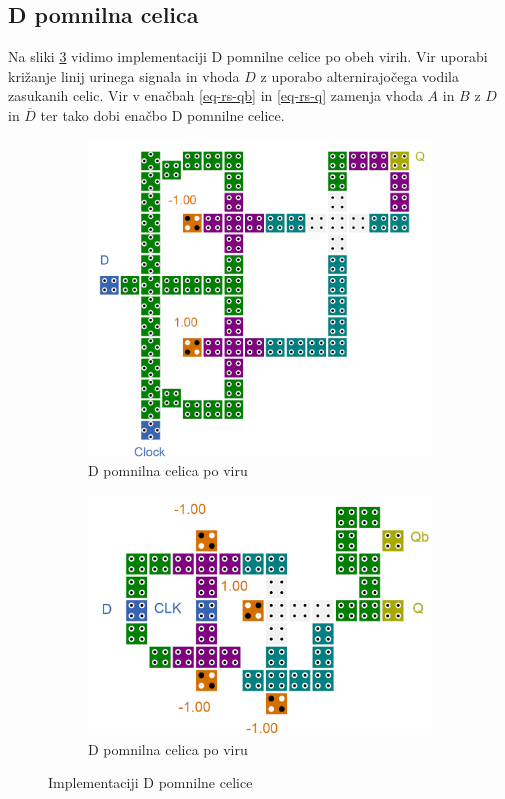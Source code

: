 \documentclass[a4paper, 11pt]{article}
\begin{document}
\subsection{D pomnilna celica}
Na sliki \ref{fig-d} vidimo implementaciji D pomnilne celice po obeh virih. Vir \cite{quantum_dot} uporabi križanje linij urinega signala in vhoda $D$ z uporabo alternirajočega vodila zasukanih celic. Vir \cite{a_novel_approach} v enačbah \ref{eq-rs-qb} in \ref{eq-rs-q} zamenja vhoda $A$ in $B$ z $D$ in $\overline{D}$ ter tako dobi enačbo D pomnilne celice.

\begin{figure}[h!]
	\begin{subfigure}[b]{0.5\textwidth}
	\includegraphics[width=\textwidth]{../img/vir_4/d.png}
	\caption{D pomnilna celica po viru \cite{quantum_dot}}
	\label{fig-d-1}
	\end{subfigure}
	\begin{subfigure}[b]{0.5\textwidth}
	\includegraphics[width=\textwidth]{../img/vir_5/d.png} 
	\caption{D pomnilna celica po viru \cite{a_novel_approach}}
	\label{fig-d-2}
	\end{subfigure}
	\caption{Implementaciji D pomnilne celice}
	\label{fig-d}
\end{figure}
\end{document}
